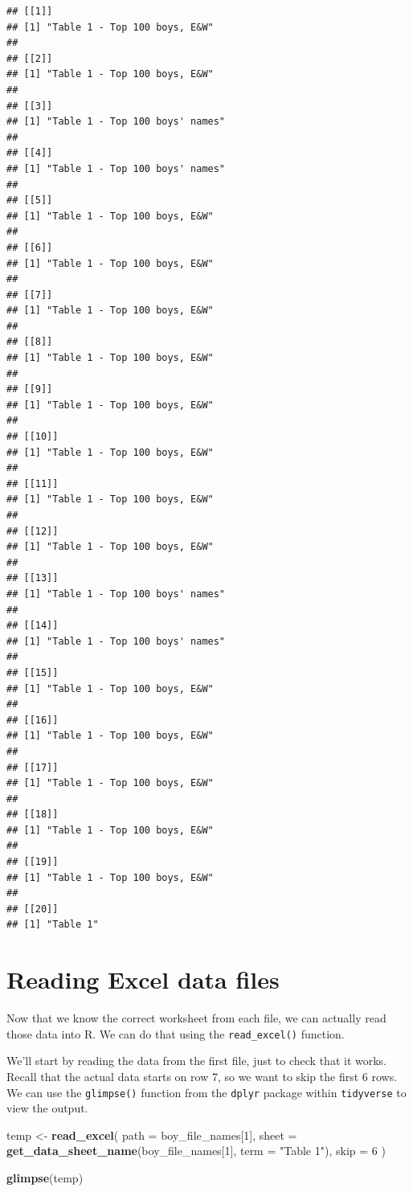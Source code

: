 \documentclass[]{book}
\newenvironment{Shaded}{\begin{snugshade}}{\end{snugshade}}
\newcommand{\DataTypeTok}[1]{\textcolor[rgb]{0.13,0.29,0.53}{#1}}
\newcommand{\DecValTok}[1]{\textcolor[rgb]{0.00,0.00,0.81}{#1}}
\newcommand{\KeywordTok}[1]{\textcolor[rgb]{0.13,0.29,0.53}{\textbf{#1}}}
\newcommand{\NormalTok}[1]{#1}
\newcommand{\StringTok}[1]{\textcolor[rgb]{0.31,0.60,0.02}{#1}}
\begin{document}
\begin{verbatim}
## [[1]]
## [1] "Table 1 - Top 100 boys, E&W"
## 
## [[2]]
## [1] "Table 1 - Top 100 boys, E&W"
## 
## [[3]]
## [1] "Table 1 - Top 100 boys' names"
## 
## [[4]]
## [1] "Table 1 - Top 100 boys' names"
## 
## [[5]]
## [1] "Table 1 - Top 100 boys, E&W"
## 
## [[6]]
## [1] "Table 1 - Top 100 boys, E&W"
## 
## [[7]]
## [1] "Table 1 - Top 100 boys, E&W"
## 
## [[8]]
## [1] "Table 1 - Top 100 boys, E&W"
## 
## [[9]]
## [1] "Table 1 - Top 100 boys, E&W"
## 
## [[10]]
## [1] "Table 1 - Top 100 boys, E&W"
## 
## [[11]]
## [1] "Table 1 - Top 100 boys, E&W"
## 
## [[12]]
## [1] "Table 1 - Top 100 boys, E&W"
## 
## [[13]]
## [1] "Table 1 - Top 100 boys' names"
## 
## [[14]]
## [1] "Table 1 - Top 100 boys' names"
## 
## [[15]]
## [1] "Table 1 - Top 100 boys, E&W"
## 
## [[16]]
## [1] "Table 1 - Top 100 boys, E&W"
## 
## [[17]]
## [1] "Table 1 - Top 100 boys, E&W"
## 
## [[18]]
## [1] "Table 1 - Top 100 boys, E&W"
## 
## [[19]]
## [1] "Table 1 - Top 100 boys, E&W"
## 
## [[20]]
## [1] "Table 1"
\end{verbatim}

\hypertarget{reading-excel-data-files}{%
\section{Reading Excel data files}\label{reading-excel-data-files}}

Now that we know the correct worksheet from each file, we can actually
read those data into R. We can do that using the \texttt{read\_excel()} function.

We'll start by reading the data from the first file, just to check
that it works. Recall that the actual data starts on row 7, so we want
to skip the first 6 rows. We can use the \texttt{glimpse()} function from
the \texttt{dplyr} package within \texttt{tidyverse} to view the output.

\begin{Shaded}
\begin{Highlighting}[]
\NormalTok{temp <-}\StringTok{ }\KeywordTok{read_excel}\NormalTok{(}
  \DataTypeTok{path =}\NormalTok{ boy_file_names[}\DecValTok{1}\NormalTok{],}
  \DataTypeTok{sheet =} \KeywordTok{get_data_sheet_name}\NormalTok{(boy_file_names[}\DecValTok{1}\NormalTok{], }\DataTypeTok{term =} \StringTok{"Table 1"}\NormalTok{),}
  \DataTypeTok{skip =} \DecValTok{6}
\NormalTok{)}

\KeywordTok{glimpse}\NormalTok{(temp)}
\end{Highlighting}
\end{Shaded}
\end{document}
